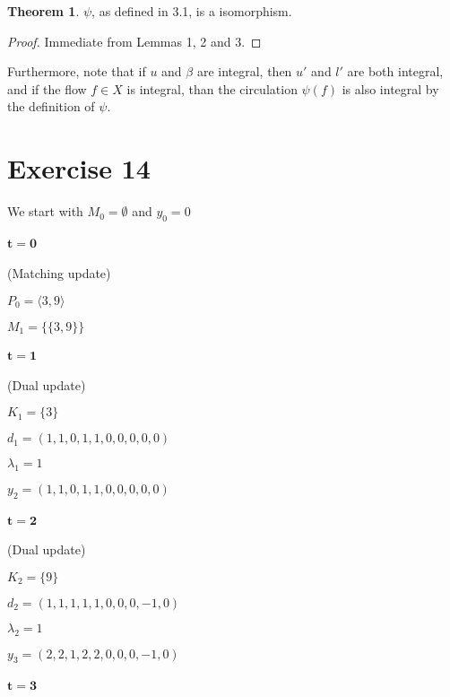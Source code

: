 \documentclass[a4paper,10pt, leqno]{article}
\theoremstyle{definition}
\def\blankpage{%
      \null%
      \clearpage}
\begin{document}
\newtheorem{theorem}{Theorem}
\begin{theorem}
 $\psi$, as defined in 3.1, is a isomorphism.
\end{theorem}
\begin{proof}
 Immediate from Lemmas 1, 2 and 3.
\end{proof}


Furthermore, note that if $u$ and $\beta$ are integral, then $u'$ and $l'$ are both integral, and if the flow $f \in X$ is integral, than the circulation $\psi(f)$ is also integral by the definition of $\psi$.

\blankpage
\section*{Exercise 14}

We start with $M_0 = \emptyset$ and $y_0 = 0$

\paragraph{$\mathbf{t = 0}$}
(Matching update)

$P_0 = \langle 3, 9 \rangle$ 

$M_1 = \{\{ 3, 9 \}\}$ 

\paragraph{$\mathbf{t = 1}$}

(Dual update)

$K_1 = \{ 3 \}$

$d_1 = (1, 1, 0, 1, 1, 0, 0, 0, 0, 0)$

$\lambda_1 = 1$

$y_2 = (1, 1, 0, 1, 1, 0, 0, 0, 0, 0)$


\paragraph{$\mathbf{t = 2}$}

(Dual update)

$K_2 = \{ 9 \}$

$d_2 = (1, 1, 1, 1, 1, 0, 0, 0, -1, 0)$

$\lambda_2 = 1$

$y_3 = (2, 2, 1, 2, 2, 0, 0, 0, -1, 0)$

\paragraph{$\mathbf{t = 3}$}
\end{document}
